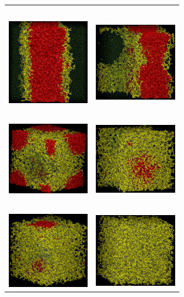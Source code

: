 \documentclass[
aip,
jcp,
reprint,
]{revtex4-1}
\begin{document}
\begin{figure}
	\centering
	\begin{tabular}{C{1.6in}@{}C{1.6in}}
		 \textcolor{white}{$w_{AB}=0.20$} & \textcolor{white}{$w_{AB}=0.30$} \\
		 \includegraphics[width=1.4in]{alt1_020} & \includegraphics[width=1.4in]{alt1_030} \\
		 \textcolor{white}{$w_{AB}=0.60$} & \textcolor{white}{$w_{AB}=0.80$} \\
		 \includegraphics[width=1.4in]{alt1_060} & \includegraphics[width=1.4in]{alt1_080} \\		
		 \textcolor{white}{$w_{AB}=0.85$} & \textcolor{white}{$w_{AB}=1.00$} \\
		 \includegraphics[width=1.4in]{alt1_085} & \includegraphics[width=1.4in]{alt1_100} \\		

\end{tabular}
\end{figure}
\end{document}
